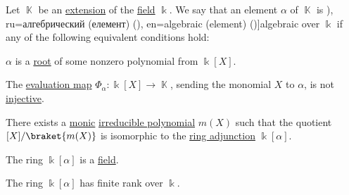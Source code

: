\begin{definition}\label{def:algebraic_element}
  Let \( \BbbK \) be an \hyperref[def:field/submodel]{extension} of the \hyperref[def:field]{field} \( \Bbbk \). We say that an element \( \alpha \) of \( \BbbK \) is \term[bg=алгебричен (елемент) (\cite[422]{Обрешков1962ВисшаАлгебра}), ru=алгебрический (елемент) (\cite[407]{Винберг2014Алгебра}), en=algebraic (element) (\cite[124]{Jacobson1985AlgebraI})]{algebraic} over \( \Bbbk \) if any of the following equivalent conditions hold:
  \begin{thmenum}
     \( \alpha \) is a \hyperref[def:root_of_polynomial]{root} of some nonzero polynomial from \( \Bbbk[X] \).

    \mimprovised The \hyperref[con:evaluation_homomorphism]{evaluation map} \( \Phi_\alpha: \Bbbk[X] \to \BbbK \), sending the monomial \( X \) to \( \alpha \), is not \hyperref[def:function_invertibility/injective]{injective}.

     There exists a \hyperref[def:monic_polynomial]{monic} \hyperref[def:domain_divisibility/irreducible]{irreducible polynomial} \( m(X) \) such that the quotient \( \Bbbk[X] / \braket{ m(X) } \) is isomorphic to the \hyperref[def:semiring_adjunction]{ring adjunction} \( \Bbbk[\alpha] \).

    \mimprovised The ring \( \Bbbk[\alpha] \) is a \hyperref[def:field]{field}.

    \mimprovised The ring \( \Bbbk[\alpha] \) has finite rank over \( \Bbbk \).
  \end{thmenum}
\end{definition}
